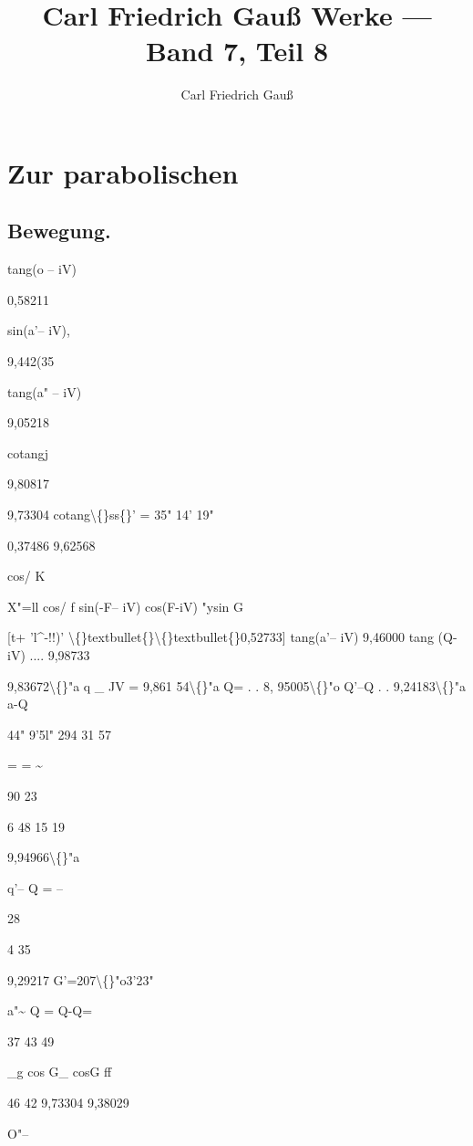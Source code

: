 \documentclass[10pt,a4paper]{article}
\title{Carl Friedrich Gau\ss{} Werke --- Band 7, Teil 8}
\author{Carl Friedrich Gau\ss{}}
\date{}
\begin{document}
\maketitle

\section*{Zur parabolischen}

\subsection*{Bewegung.}

tang(o -- iV)

0,58211

sin(a'-- iV),

9,442(35

tang(a" -- iV)

9,05218

cotangj

9,80817

9,73304 cotang\textbackslash\{\}ss\{\}'
= 35" 14' 19"

0,37486
9,62568

cos/
K

X"=ll
cos/
f
sin(-F-- iV)
cos(F-iV)
"ysin G

[t+ 'l\textasciicircum{}-!!)' \textbackslash\{\}textbullet\{\}\textbackslash\{\}textbullet\{\}0,52733]
tang(a'-- iV)
9,46000
tang (Q-iV) .... 9,98733

9,83672\textbackslash\{\}"a
q \_ JV =
9,861 54\textbackslash\{\}"a
Q=
. . 8, 95005\textbackslash\{\}"o
Q'--Q
. . 9,24183\textbackslash\{\}"a
a-Q

44" 9'5l"
294 31 57

=
= \textasciitilde{}

90
23

6 48
15 19

9,94966\textbackslash\{\}"a

q'-- Q = --

28

4 35

9,29217
G'=207\textbackslash\{\}"o3'23"

a"\textasciitilde{} Q = Q-Q=

37 43 49

\_g cos G\_
cosG
ff

46 42
9,73304
9,38029


O"--
\end{document}
